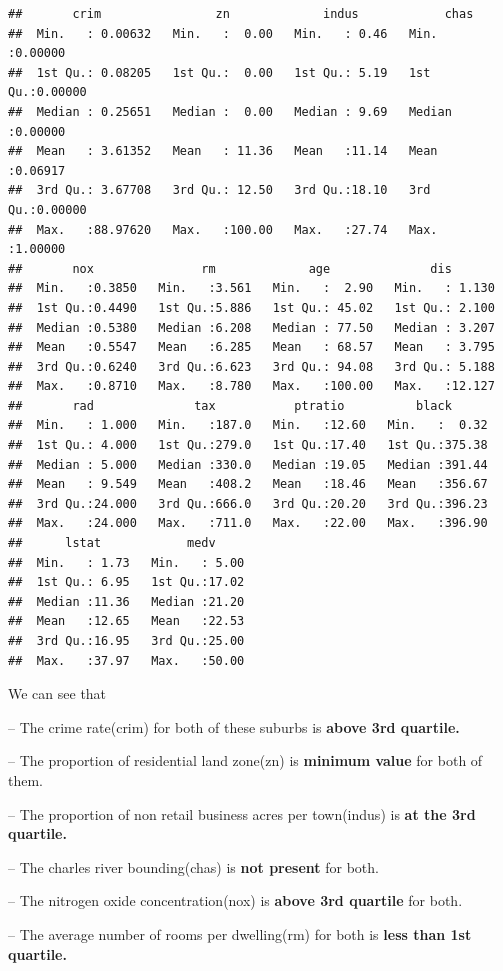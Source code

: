 \documentclass[
]{article}
\begin{document}
\begin{verbatim}
##       crim                zn             indus            chas        
##  Min.   : 0.00632   Min.   :  0.00   Min.   : 0.46   Min.   :0.00000  
##  1st Qu.: 0.08205   1st Qu.:  0.00   1st Qu.: 5.19   1st Qu.:0.00000  
##  Median : 0.25651   Median :  0.00   Median : 9.69   Median :0.00000  
##  Mean   : 3.61352   Mean   : 11.36   Mean   :11.14   Mean   :0.06917  
##  3rd Qu.: 3.67708   3rd Qu.: 12.50   3rd Qu.:18.10   3rd Qu.:0.00000  
##  Max.   :88.97620   Max.   :100.00   Max.   :27.74   Max.   :1.00000  
##       nox               rm             age              dis        
##  Min.   :0.3850   Min.   :3.561   Min.   :  2.90   Min.   : 1.130  
##  1st Qu.:0.4490   1st Qu.:5.886   1st Qu.: 45.02   1st Qu.: 2.100  
##  Median :0.5380   Median :6.208   Median : 77.50   Median : 3.207  
##  Mean   :0.5547   Mean   :6.285   Mean   : 68.57   Mean   : 3.795  
##  3rd Qu.:0.6240   3rd Qu.:6.623   3rd Qu.: 94.08   3rd Qu.: 5.188  
##  Max.   :0.8710   Max.   :8.780   Max.   :100.00   Max.   :12.127  
##       rad              tax           ptratio          black       
##  Min.   : 1.000   Min.   :187.0   Min.   :12.60   Min.   :  0.32  
##  1st Qu.: 4.000   1st Qu.:279.0   1st Qu.:17.40   1st Qu.:375.38  
##  Median : 5.000   Median :330.0   Median :19.05   Median :391.44  
##  Mean   : 9.549   Mean   :408.2   Mean   :18.46   Mean   :356.67  
##  3rd Qu.:24.000   3rd Qu.:666.0   3rd Qu.:20.20   3rd Qu.:396.23  
##  Max.   :24.000   Max.   :711.0   Max.   :22.00   Max.   :396.90  
##      lstat            medv      
##  Min.   : 1.73   Min.   : 5.00  
##  1st Qu.: 6.95   1st Qu.:17.02  
##  Median :11.36   Median :21.20  
##  Mean   :12.65   Mean   :22.53  
##  3rd Qu.:16.95   3rd Qu.:25.00  
##  Max.   :37.97   Max.   :50.00
\end{verbatim}

We can see that

-- The crime rate(crim) for both of these suburbs is \textbf{above 3rd
quartile.}

-- The proportion of residential land zone(zn) is \textbf{minimum value}
for both of them.

-- The proportion of non retail business acres per town(indus) is
\textbf{at the 3rd quartile.}

-- The charles river bounding(chas) is \textbf{not present} for both.

-- The nitrogen oxide concentration(nox) is \textbf{above 3rd quartile}
for both.

-- The average number of rooms per dwelling(rm) for both is \textbf{less
than 1st quartile.}
\end{document}
